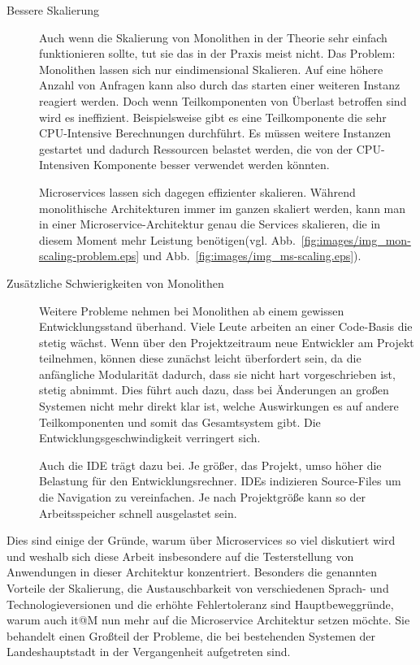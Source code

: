 \documentclass[12pt,a4paper,bibliography=totocnumbered,listof=totocnumbered]{scrartcl}
\begin{document}
\begin{description}
	\item[Bessere Skalierung] Auch wenn die Skalierung von Monolithen in der Theorie sehr einfach funktionieren sollte, tut sie das in der Praxis meist nicht. Das Problem: Monolithen lassen sich nur eindimensional Skalieren. Auf eine höhere Anzahl von Anfragen kann also durch das starten einer weiteren Instanz reagiert werden. Doch wenn Teilkomponenten von Überlast betroffen sind wird es ineffizient. Beispielsweise gibt es eine Teilkomponente die sehr CPU-Intensive Berechnungen durchführt. Es müssen weitere Instanzen gestartet und dadurch Ressourcen belastet werden, die von der CPU-Intensiven Komponente besser verwendet werden könnten.
	
	
	Microservices lassen sich dagegen effizienter skalieren. Während monolithische Architekturen immer im ganzen skaliert werden, kann man in einer Microservice-Architektur genau die Services skalieren, die in diesem Moment mehr Leistung benötigen(vgl. Abb.~\ref{fig:images/img_mon-scaling-problem.eps} und Abb.~\ref{fig:images/img_ms-scaling.eps}).
	
	
	\item[Zusätzliche Schwierigkeiten von Monolithen] Weitere Probleme nehmen bei Monolithen ab einem gewissen Entwicklungsstand überhand. Viele Leute arbeiten an einer Code-Basis die stetig wächst. Wenn über den Projektzeitraum neue Entwickler am Projekt teilnehmen, können diese zunächst leicht überfordert sein, da die anfängliche Modularität dadurch, dass sie nicht hart vorgeschrieben ist, stetig abnimmt. Dies führt auch dazu, dass bei Änderungen an großen Systemen nicht mehr direkt klar ist, welche Auswirkungen es auf andere Teilkomponenten und somit das Gesamtsystem gibt. Die Entwicklungsgeschwindigkeit verringert sich.
	
	Auch die IDE trägt dazu bei. Je größer, das Projekt, umso höher die Belastung für den Entwicklungsrechner. IDEs indizieren Source-Files um die Navigation zu vereinfachen. Je nach Projektgröße kann so der Arbeitsspeicher schnell ausgelastet sein.
	
\end{description}

Dies sind einige der Gründe, warum über Microservices so viel diskutiert wird und weshalb sich diese Arbeit insbesondere auf die Testerstellung von Anwendungen in dieser Architektur konzentriert. Besonders die genannten Vorteile der Skalierung, die Austauschbarkeit von verschiedenen Sprach- und Technologieversionen und die erhöhte Fehlertoleranz sind Hauptbeweggründe, warum auch it@M nun mehr auf die Microservice Architektur setzen möchte. Sie behandelt einen Großteil der Probleme, die bei bestehenden Systemen der Landeshauptstadt in der Vergangenheit aufgetreten sind.
\end{document}
